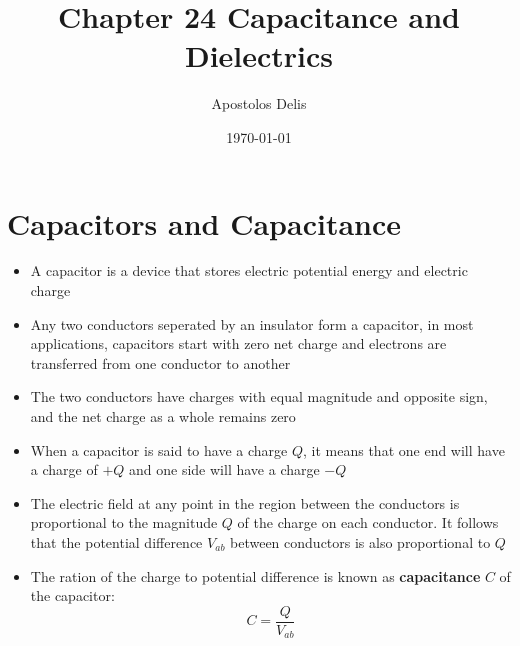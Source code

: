 \documentclass[11pt, a4paper]{article}
\begin{document}
\title{Chapter 24 Capacitance and Dielectrics}
\author{Apostolos Delis}
\date{\today}
\maketitle

\tableofcontents
\section[24.1, Capacitors and Capacitance]{Capacitors and Capacitance}
\begin{itemize}
    \item A capacitor is a device that stores electric potential energy and electric charge
    \item Any two conductors seperated by an insulator form a capacitor, in most
        applications, capacitors start with zero net charge and electrons are transferred
        from one conductor to another
    \item The two conductors have charges with equal magnitude and opposite sign, and the
        net charge as a whole remains zero
    \item When a capacitor is said to have a charge $Q$, it means that one end will have
        a charge of $+Q$ and one side will have a charge $-Q$
    \item The electric field at any point in the region between the conductors is
        proportional to the magnitude $Q$ of the charge on each conductor. It follows
        that the potential difference $V_{ab}$ between conductors is also proportional to
        $Q$
    \item The ration of the charge to potential difference is known as
        \textbf{capacitance} $C$ of the capacitor:
        \begin{equation}
            C = \frac{Q}{V_{ab}}
        \end{equation}
\end{itemize}
\end{document}
